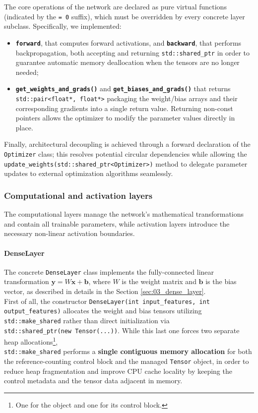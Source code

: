 The core operations of the network are declared as pure virtual functions (indicated by the \texttt{= 0} suffix), which must be overridden by every concrete layer subclass. Specifically, we implemented:
\begin{itemize}
    \item[-] \textbf{\texttt{forward}}, that computes forward activations, and \textbf{\texttt{backward}}, that performs backpropagation, both accepting and returning \texttt{std::shared\_ptr} in order to guarantee automatic memory deallocation when the tensors are no longer needed;
    \item[-] \textbf{\texttt{get\_weights\_and\_grads()}} and \textbf{\texttt{get\_biases\_and\_grads()}} that returns \texttt{std::pair<float*, float*>} packaging the weight/bias arrays and their corresponding gradients into a single return value. Returning non-const pointers allows the optimizer to modify the parameter values directly in place.
\end{itemize}
\vspace{2ex}

Finally, architectural decoupling is achieved through a forward declaration of the \texttt{Optimizer} class; this resolves potential circular dependencies while allowing the \texttt{update\_weights(std::shared\_ptr<Optimizer>)} method to delegate parameter updates to external optimization algorithms seamlessly.

\subsubsection{Computational and activation layers}

The computational layers manage the network's mathematical transformations and contain all trainable parameters, while activation layers introduce the necessary non-linear activation boundaries.

\paragraph{DenseLayer}

The concrete \texttt{DenseLayer} class implements the fully-connected linear transformation $\mathbf{y} = W \mathbf{x} + \mathbf{b}$, where $W$ is the weight matrix and $\mathbf{b}$ is the bias vector, as described in details in the Section \ref{sec:03_dense_layer}.\\

First of all, the constructor \texttt{DenseLayer(int input\_features, int output\_features)} allocates the weight and bias tensors utilizing \texttt{std::make\_shared} rather than direct initialization via \\\texttt{std::shared\_ptr(new Tensor(...))}. While this last one forces two separate heap allocations\footnote{One for the object and one for its control block.}, \\\texttt{std::make\_shared} performs a \textbf{single contiguous memory allocation} for both the reference-counting control block and the managed \texttt{Tensor} object, in order to reduce heap fragmentation and improve CPU cache locality by keeping the control metadata and the tensor data adjacent in memory.\\

